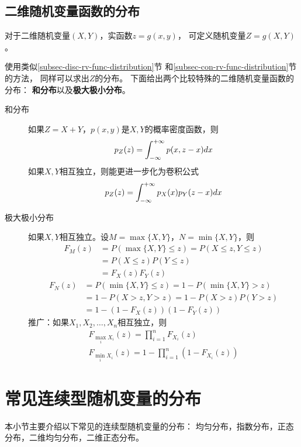 \subsection{二维随机变量函数的分布}
对于二维随机变量$(X,Y)$，实函数$z=g(x,y)$，
可定义随机变量$Z=g(X,Y)$。

使用类似\ref{subsec-disc-rv-func-distribution}节
和\ref{subsec-con-rv-func-distribution}节的方法，
同样可以求出$Z$的分布。
下面给出两个比较特殊的二维随机变量函数的分布：
\textbf{和分布}以及\textbf{极大极小分布}。

\begin{description}
  \item[和分布]
  如果$Z=X+Y$，$p(x,y)$是$X,Y$的概率密度函数，则
  \begin{displaymath}
    p_Z(z) = \int_{-\infty}^{+\infty} p(x,z-x)dx
  \end{displaymath}
  如果$X,Y$相互独立，则能更进一步化为卷积公式
  \begin{displaymath}
    p_Z(z) = \int_{-\infty}^{+\infty} p_X(x)p_Y(z-x)dx
  \end{displaymath}
  \item[极大极小分布]
  如果$X,Y$相互独立。设$M=\max\{X,Y\}$，$N=\min\{X,Y\}$，则
  \begin{align*}
    F_M(z) &= P(\max\{X,Y\}\le z) = P(X\le z, Y\le z) \\
    &= P(X\le z)P(Y\le z) \\
    &= F_X(z)F_Y(z)
  \end{align*}
  \begin{align*}
    F_N(z) &= P(\min\{X,Y\}\le z) = 1 - P(\min\{X,Y\}>z) \\
    &= 1 - P(X>z,Y>z) = 1 - P(X>z)P(Y>z) \\
    &= 1 - (1-F_X(z))(1-F_Y(z))
  \end{align*}
  推广：如果$X_1,X_2,\dots,X_n$相互独立，则
  \begin{gather*}
    F_{\max_iX_i}(z) = \prod_{i=1}^{n}F_{X_i}(z) \\
    F_{\min_iX_i}(z) = 1-\prod_{i=1}^{n}(1-F_{X_i}(z))
  \end{gather*}
\end{description}

\section{常见连续型随机变量的分布}
本小节主要介绍以下常见的连续型随机变量的分布：
均匀分布，指数分布，正态分布，二维均匀分布，二维正态分布。

